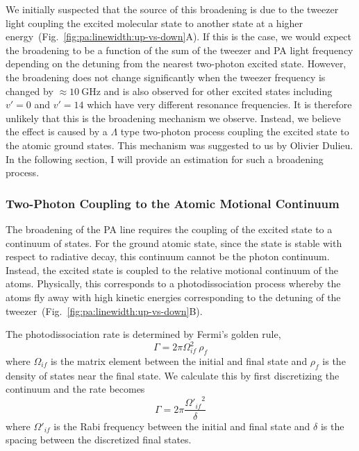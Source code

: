 We initially suspected that the source of this broadening is due to the tweezer light
coupling the excited molecular state to another state at
a higher energy~(Fig.~\ref{fig:pa:linewidth:up-vs-down}A).
If this is the case, we would expect the broadening to be a function of
the sum of the tweezer and PA light frequency depending on the detuning from the nearest
two-photon excited state.
However, the broadening does not change significantly when the tweezer frequency
is changed by $\approx\!10~\mathrm{GHz}$ and
is also observed for other excited states including $v'=0$ and $v'=14$
which have very different resonance frequencies.
It is therefore unlikely that this is the broadening mechanism we observe.
Instead, we believe the effect is caused by a $\Lambda$ type two-photon process
coupling the excited state to the atomic ground states.
This mechanism was suggested to us by Olivier Dulieu.
In the following section, I will provide an estimation for such a broadening process.

\subsubsection{Two-Photon Coupling to the Atomic Motional Continuum}
\label{ch:pa:linewidth:two-photn-down}
The broadening of the PA line requires the coupling of the excited state to a continuum of states.
For the ground atomic state, since the state is stable with respect to radiative decay,
this continuum cannot be the photon continuum.
Instead, the excited state is coupled to the relative motional continuum of the atoms.
Physically, this corresponds to a photodissociation process
whereby the atoms fly away with high kinetic energies corresponding
to the detuning of the tweezer~(Fig.~\ref{fig:pa:linewidth:up-vs-down}B).

The photodissociation rate is determined by Fermi's golden rule,
\[
  \Gamma=2\pi\Omega_{if}^2\ \rho_f
\]
where $\Omega_{if}$ is the matrix element between the initial and final state
and $\rho_f$ is the density of states near the final state.
We calculate this by first discretizing the continuum and the rate becomes
\[
  \Gamma=2\pi\frac{{\Omega'_{if}}^2}{\delta}
\]
where $\Omega'_{if}$ is the Rabi frequency between the initial and final state
and $\delta$ is the spacing between the discretized final states.

